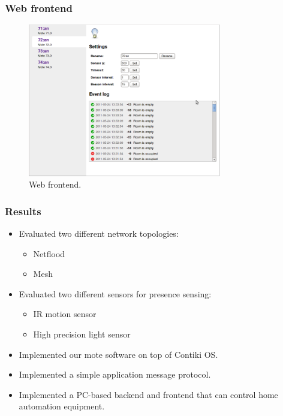 \documentclass{beamer}
\begin{document}
\begin{frame}
\frametitle{Web frontend}

	\begin{center}
		\begin{figure}
			\includegraphics[width=0.75\textwidth]{webfrontend.png}
			\caption{Web frontend.}
		\end{figure}
	\end{center}

\end{frame}

\begin{frame}
\frametitle{Results}

	\begin{block}
		
		\begin{itemize}\setlength{\itemsep}{4mm}
			\item
              Evaluated two different network topologies:
			  \begin{itemize}
					\item Netflood
					\item Mesh
			  \end{itemize}
			\item
              Evaluated two different sensors for presence sensing:
			  \begin{itemize}
					\item IR motion sensor
					\item High precision light sensor
			  \end{itemize}
			\item
              Implemented our mote software on top of Contiki OS.
			\item
              Implemented a simple application message protocol.
			\item
              Implemented a PC-based backend and frontend that can control home
			  automation equipment.
		\end{itemize}

	\end{block}

\end{frame}
\end{document}
